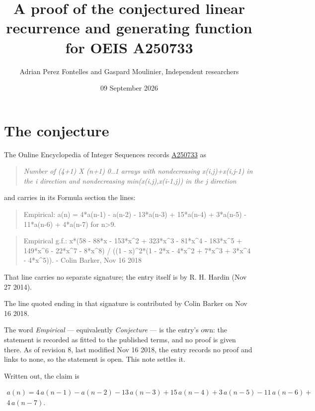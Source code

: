 \documentclass[11pt]{article}
\title{A proof of the conjectured linear recurrence and generating function for OEIS A250733}
\author{Adrian Perez Fontelles and Gaspard Moulinier, Independent researchers}
\date{09 September 2026}
\theoremstyle{definition}
\begin{document}
\maketitle
\section{The conjecture}

The Online Encyclopedia of Integer Sequences records \href{https://oeis.org/A250733}{A250733} as

\begin{quote}\itshape Number of (4+1) X (n+1) 0..1 arrays with nondecreasing x(i,j)+x(i,j-1) in the i direction and nondecreasing min(x(i,j),x(i-1,j)) in the j direction\end{quote}

and carries in its Formula section the lines:

\begin{quote}\ttfamily Empirical: a(n) = 4*a(n-1) - a(n-2) - 13*a(n-3) + 15*a(n-4) + 3*a(n-5) - 11*a(n-6) + 4*a(n-7) for n>9.\end{quote}

\begin{quote}\ttfamily Empirical g.f.: x*(58 - 88*x - 153*x\textasciicircum{}2 + 323*x\textasciicircum{}3 - 81*x\textasciicircum{}4 - 183*x\textasciicircum{}5 + 149*x\textasciicircum{}6 - 22*x\textasciicircum{}7 - 8*x\textasciicircum{}8) / ((1 - x)\textasciicircum{}2*(1 - 2*x - 4*x\textasciicircum{}2 + 7*x\textasciicircum{}3 + 3*x\textasciicircum{}4 - 4*x\textasciicircum{}5)). - Colin Barker, Nov 16 2018\end{quote}

That line carries no separate signature; the entry itself is by R. H. Hardin (Nov 27 2014).

The line quoted ending in that signature is contributed by Colin Barker on Nov 16 2018.

The word {\itshape Empirical} --- equivalently {\itshape Conjecture} --- is the entry's own: the statement is recorded as fitted to the published terms, and no proof is given there. As of revision 8, last modified Nov 16 2018, the entry records no proof and links to none, so the statement is open. This note settles it.

Written out, the claim is

\begin{multline*} a(n) = 4\,a(n-1) - a(n-2) - 13\,a(n-3) + 15\,a(n-4) + 3\,a(n-5) - 11\,a(n-6) + \\ 4\,a(n-7). \end{multline*}
\end{document}
